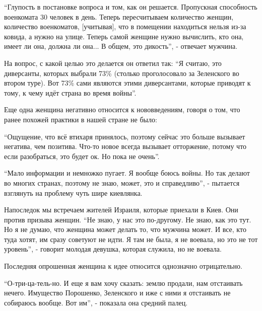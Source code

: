 \begin{multicols}{2}

\enquote{Глупость в постановке вопроса и том, как он решается. Пропускная способность
военкомата 30 человек в день. Теперь пересчитываем количество женщин,
количество военкоматов, [учитывая], что в помещении находиться нельзя из-за
ковида, а нужно на улице. Теперь самой женщине нужно вычислить, кто она, имеет
ли она, должна ли она... В общем, это дикость}, - отвечает мужчина. 

На вопрос, с какой целью это делается он ответил так: \enquote{Я считаю, это
диверсанты, которых выбрали 73\% (столько проголосовало за Зеленского во втором
туре). Вот 73\% сами являются этими диверсантами, которые приводят к тому, к
чему идёт страна во время войны}.


Еще одна женщина негативно относится к нововведениям, говоря о том, что ранее
похожей практики в нашей стране не было:

\enquote{Ощущение, что всё втихаря принялось, поэтому сейчас это больше вызывает
негатива, чем позитива. Что-то новое всегда вызывает отторжение, потому что
если разобраться, это будет ок. Но пока не очень}.


\enquote{Мало информации и немножко пугает. Я вообще боюсь войны. Но так делают во
многих странах, поэтому не знаю, может, это и справедливо}, - пытается
взглянуть на проблему чуть шире киевлянка.


Напоследок мы встречаем жителей Израиля, которые приехали в Киев. Они против
призыва женщин. \enquote{Не знаю, у нас это по-другому. Не знаю, как это тут. Но я не
думаю, что женщина может делать то, что мужчина может. И все, кто туда хотят,
им сразу советуют не идти. Я там не была, я не воевала, но это не тот уровень},
- говорит молодая девушка, которая служила, но не воевала.


Последняя опрошенная женщина к идее относится однозначно отрицательно.

\enquote{О-три-ца-тель-но. И еще я вам хочу сказать: землю продали, нам отстаивать
нечего. Имущество Порошенко, Зеленского и иже с ними я отстаивать не собираюсь
вообще. Вот им}, - показала она средний палец.

\end{multicols} %

